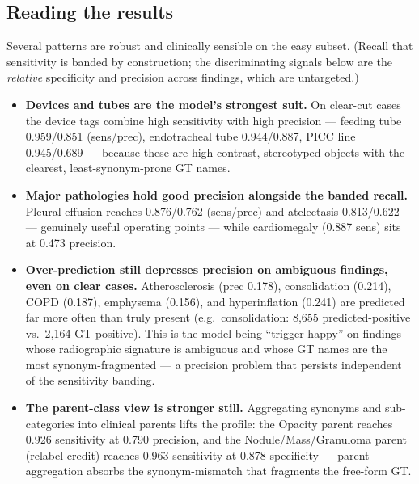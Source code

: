 \documentclass[11pt,a4paper]{article}
\begin{document}
\subsection{Reading the results}
Several patterns are robust and clinically sensible on the easy subset. (Recall that sensitivity is banded by construction; the discriminating signals below are the \emph{relative} specificity and precision across findings, which are untargeted.)
\begin{itemize}[leftmargin=1.4em]
  \item \textbf{Devices and tubes are the model's strongest suit.} On clear-cut cases the device tags combine high sensitivity with high precision --- feeding tube 0.959/0.851 (sens/prec), endotracheal tube 0.944/0.887, PICC line 0.945/0.689 --- because these are high-contrast, stereotyped objects with the clearest, least-synonym-prone GT names.
  \item \textbf{Major pathologies hold good precision alongside the banded recall.} Pleural effusion reaches 0.876/0.762 (sens/prec) and atelectasis 0.813/0.622 --- genuinely useful operating points --- while cardiomegaly (0.887 sens) sits at 0.473 precision.
  \item \textbf{Over-prediction still depresses precision on ambiguous findings, even on clear cases.} Atherosclerosis (prec 0.178), consolidation (0.214), COPD (0.187), emphysema (0.156), and hyperinflation (0.241) are predicted far more often than truly present (e.g.\ consolidation: 8{,}655 predicted-positive vs.\ 2{,}164 GT-positive). This is the model being ``trigger-happy'' on findings whose radiographic signature is ambiguous and whose GT names are the most synonym-fragmented --- a precision problem that persists independent of the sensitivity banding.
  \item \textbf{The parent-class view is stronger still.} Aggregating synonyms and sub-categories into clinical parents lifts the profile: the Opacity parent reaches 0.926 sensitivity at 0.790 precision, and the Nodule/Mass/Granuloma parent (relabel-credit) reaches 0.963 sensitivity at 0.878 specificity --- parent aggregation absorbs the synonym-mismatch that fragments the free-form GT.
\end{itemize}
\end{document}
